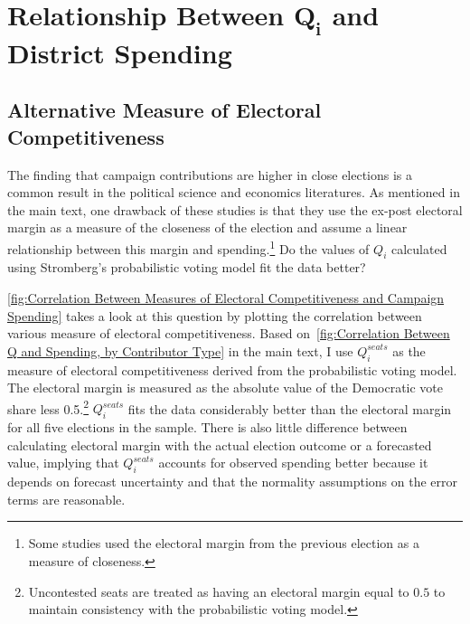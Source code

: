\documentclass[12pt,final,fleqn]{article}
\theoremstyle{plain}
\begin{document}
\section{Relationship Between $\mathbf{Q_i}$ and District Spending}
\subsection{Alternative Measure of Electoral Competitiveness}
The finding that campaign contributions are higher in close elections is a common result in the political science and economics literatures. As mentioned in the main text, one drawback of these studies is that they use the ex-post electoral margin as a measure of the closeness of the election and assume a linear relationship between this margin and spending.\footnote{Some studies used the electoral margin from the previous election as a measure of closeness.} Do the values of $Q_i$ calculated using Stromberg's probabilistic voting model fit the data better?

\autoref{fig:Correlation Between Measures of Electoral Competitiveness and Campaign Spending} takes a look at this question by plotting the correlation between various measure of electoral competitiveness. Based on~\autoref{fig:Correlation Between Q and Spending, by Contributor Type} in the main text, I use $Q_i^{seats}$ as the measure of electoral competitiveness derived from the probabilistic voting model. The electoral margin is measured as the absolute value of the Democratic vote share less 0.5.\footnote{Uncontested seats are treated as having an electoral margin equal to $0.5$ to maintain consistency with the probabilistic voting model.} $Q_i^{seats}$ fits the data considerably better than the electoral margin for all five elections in the sample. There is also little difference between calculating electoral margin with the actual election outcome or a forecasted value, implying that $Q_i^{seats}$ accounts for observed spending better because it depends on forecast uncertainty and that the normality assumptions on the error terms are reasonable. 
\end{document}
